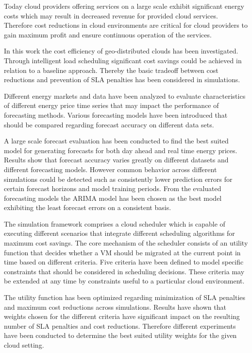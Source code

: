 







Today cloud providers offering services on a large scale exhibit significant energy costs which may result in decreased revenue for provided cloud services. Therefore cost reductions in cloud environments are critical for cloud providers to gain maximum profit and ensure continuous operation of the services. 

In this work the cost efficiency of geo-distributed clouds has been investigated. 
Through intelligent load scheduling significant cost savings could be achieved in relation to a baseline approach. Thereby the basic tradeoff between cost reductions and prevention of SLA penalties has been considered in simulations. 

Different energy markets and data have been analyzed to evaluate characteristics of different energy price time series that may impact the performance of forecasting methods. Various forecasting models have been introduced that should be compared regarding forecast accuracy on different data sets. 

A large scale forecast evaluation has been conducted to find the best suited model for generating forecasts for both day ahead and real time energy prices. Results show that forecast accuracy varies greatly on different datasets and different forecasting models. However common behavior across different simulations could be detected such as consistently lower prediction errors for certain forecast horizons and model training periods. From the evaluated forecasting models the ARIMA model has been chosen as the best model exhibiting the least forecast errors on a consistent basis. 

The simulation framework comprises a cloud scheduler which is capable of executing different scenarios that integrate different scheduling algorithms for maximum cost savings. 
The core mechanism of the scheduler consists of an utility function that decides whether a VM should be migrated at the current point in time based on different criteria. Five criteria have been defined to model specific constraints that should be considered in scheduling decisions. 
These criteria may be extended at any time by constraints useful to a particular cloud environment. 

The utility function has been optimized regarding minimization of SLA penalties and maximum cost reductions across simulations. Results have shown that weights chosen for the different criteria have significant impact on the resulting number of SLA penalties and cost reductions. Therefore different experiments have been conducted to determine the best suited utility weights for the given cloud setting. 


